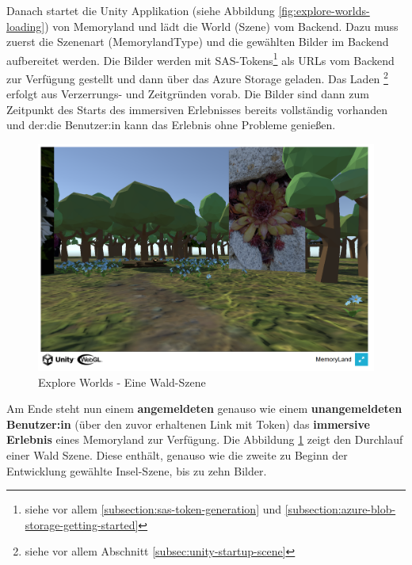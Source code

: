 Danach startet die Unity Applikation (siehe Abbildung 
\ref{fig:explore-worlds-loading}) von Memoryland und lädt die World (Szene) vom Backend. Dazu muss zuerst die Szenenart (MemorylandType) und die gewählten Bilder im Backend aufbereitet werden. Die Bilder werden mit SAS-Tokens\footnote{siehe vor allem \ref{subsection:sas-token-generation} und \ref{subsection:azure-blob-storage-getting-started}} als URLs vom Backend zur Verfügung gestellt und dann über das Azure Storage geladen. Das Laden \footnote{siehe vor allem Abschnitt \ref{subsec:unity-startup-scene}} erfolgt aus Verzerrungs- und Zeitgründen vorab. Die Bilder sind dann zum Zeitpunkt des Starts des immersiven Erlebnisses bereits vollständig vorhanden und der:die Benutzer:in kann das Erlebnis ohne Probleme genie\ss{}en. 


\begin{figure} [h t]
    \centering
    \includegraphics[scale=0.5]{pics/explore_worlds_forest.PNG}
    \caption{Explore Worlds - Eine Wald-Szene}
    \label{fig:explore-worlds-forest}
\end{figure}

Am Ende steht nun einem \textbf{angemeldeten} genauso wie einem \textbf{unangemeldeten Benutzer:in} (über den zuvor erhaltenen Link mit Token) das \textbf{immersive Erlebnis} eines Memoryland zur Verfügung. Die Abbildung \ref{fig:explore-worlds-forest} zeigt den Durchlauf einer Wald Szene. Diese enthält, genauso wie die zweite zu Beginn der Entwicklung gewählte Insel-Szene, bis zu zehn Bilder. 

